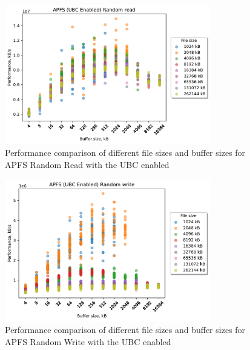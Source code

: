 \begin{figure}[!htb]
	\label{fig:bench_apfs_ubc_scatter_rnd_read}
	\begin{center}
		\includegraphics[width=0.8\textwidth]{figures.nosync/benchmarking/APFS/scatter-UBC Enabled-Random read.pdf}
	\end{center}
	\caption[Comparison of Random Read performance for file size and buffer size for APFS with the UBC enabled]{Performance comparison of different file sizes and buffer sizes for APFS Random Read with the UBC enabled}
\end{figure}
\begin{figure}[!htb]
	\label{fig:bench_apfs_ubc_scatter_rnd_write}
	\begin{center}
		\includegraphics[width=0.8\textwidth]{figures.nosync/benchmarking/APFS/scatter-UBC Enabled-Random write.pdf}
	\end{center}
	\caption[Comparison of Random Write performance for file size and buffer size for APFS with the UBC enabled]{Performance comparison of different file sizes and buffer sizes for APFS Random Write with the UBC enabled}
\end{figure}
\clearpage



